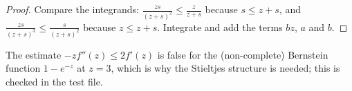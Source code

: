 \begin{proof}
\leanok
Compare the integrands: $\frac{z s}{(z+s)^2} \le \frac{z}{z+s}$ because $s \le z + s$, and $\frac{z s}{(z+s)^3} \le \frac{s}{(z+s)^2}$ because $z \le z + s$. Integrate and add the terms $b z$, $a$ and $b$.
\end{proof}

The estimate $-z f''(z) \le 2 f'(z)$ is false for the (non-complete) Bernstein function $1 - e^{-z}$ at $z = 3$, which is why the Stieltjes structure is needed; this is checked in the test file.
